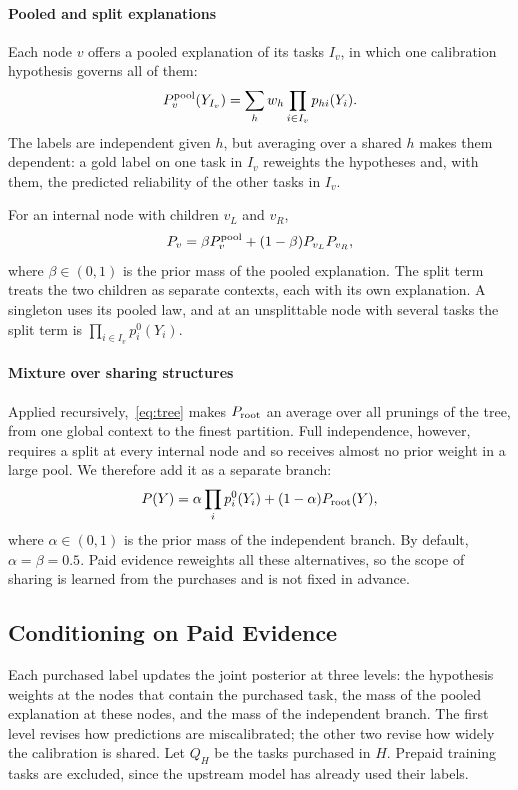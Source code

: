 \documentclass[journal]{IEEEtran}
\begin{document}
\paragraph{Pooled and split explanations}
Each node $v$ offers a pooled explanation of its tasks $I_v$, in which one calibration hypothesis governs all of them:
\begin{equation}
 P_v^{\rm pool}(Y_{I_v})=\sum_h w_h\prod_{i\in I_v}p_{hi}(Y_i).
 \label{eq:pool}
\end{equation}
The labels are independent given $h$, but averaging over a shared $h$ makes them dependent: a gold label on one task in $I_v$ reweights the hypotheses and, with them, the predicted reliability of the other tasks in $I_v$.

For an internal node with children $v_L$ and $v_R$,
\begin{equation}
 P_v=\beta P_v^{\rm pool}+(1-\beta)P_{v_L}P_{v_R},
 \label{eq:tree}
\end{equation}
where $\beta\in(0,1)$ is the prior mass of the pooled explanation. The split term treats the two children as separate contexts, each with its own explanation. A singleton uses its pooled law, and at an unsplittable node with several tasks the split term is $\prod_{i\in I_v}p_i^0(Y_i)$.

\paragraph{Mixture over sharing structures}
Applied recursively,~\eqref{eq:tree} makes $P_{\rm root}$ an average over all prunings of the tree, from one global context to the finest partition. Full independence, however, requires a split at every internal node and so receives almost no prior weight in a large pool. We therefore add it as a separate branch:
\begin{equation}
 P(Y)=\alpha\prod_i p_i^0(Y_i)+(1-\alpha)P_{\rm root}(Y),
 \label{eq:root}
\end{equation}
where $\alpha\in(0,1)$ is the prior mass of the independent branch. By default, $\alpha=\beta=0.5$. Paid evidence reweights all these alternatives, so the scope of sharing is learned from the purchases and is not fixed in advance.

\subsection{Conditioning on Paid Evidence}
\label{sec:conditioning}

Each purchased label updates the joint posterior at three levels: the hypothesis weights at the nodes that contain the purchased task, the mass of the pooled explanation at these nodes, and the mass of the independent branch. The first level revises how predictions are miscalibrated; the other two revise how widely the calibration is shared. Let $Q_H$ be the tasks purchased in $H$. Prepaid training tasks are excluded, since the upstream model has already used their labels.
\end{document}
